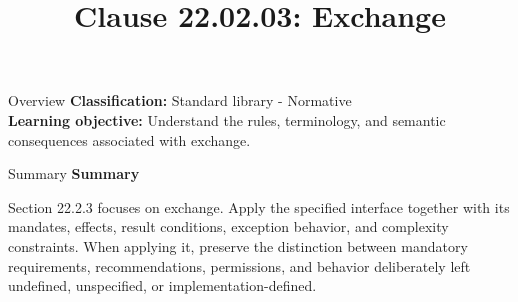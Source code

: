 \documentclass[10pt,letterpaper]{article}
\title{Clause 22.02.03: Exchange}
\author{}
\date{}
\begin{document}
\maketitle
\begin{CornellOverviewBox}{Overview}
\textbf{Classification:} Standard library - Normative\\[2pt]
\textbf{Learning objective:} Understand the rules, terminology, and semantic consequences associated with exchange.
\end{CornellOverviewBox}\begin{CornellSummaryBox}{Summary}
{\sffamily\bfseries\color{Accent} Summary}\par\vspace{3pt}Section 22.2.3 focuses on exchange. Apply the specified interface together with its mandates, effects, result conditions, exception behavior, and complexity constraints. When applying it, preserve the distinction between mandatory requirements, recommendations, permissions, and behavior deliberately left undefined, unspecified, or implementation-defined.
\end{CornellSummaryBox}
\end{document}
